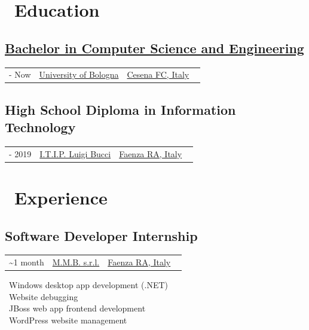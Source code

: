 \documentclass{article}
\makeatletter
\newcommand{\event}[3]{
    \begin{tabularx}{\linewidth}{@{}>{\raggedright\arraybackslash}X >{\centering\arraybackslash}X >{\raggedleft\arraybackslash}X@{}}
        #1 & #2 & #3
    \end{tabularx}
    \vspace{-10pt}
}
\makeatother
\begin{document}
\setlength{\columnsep}{50pt}
\begin{paracol}{2}
    \section*{\faGraduationCap \ Education}

    \begin{tcolorbox}
        \subsection*{\href{https://corsi.unibo.it/1cycle/ComputerScienceEngineering}{Bachelor in Computer Science and Engineering}}
        \event
            {\faCalendar* 2019 - Now}
            {\href{https://www.unibo.it/en/}{University of Bologna}}
            {\href{https://www.openstreetmap.org/relation/42809}{Cesena FC, Italy} \ \faCity}
    \end{tcolorbox}

    \begin{tcolorbox}
        \subsection*{High School Diploma in Information Technology}
        \event
            {\faCalendar* 2014 - 2019}
            {\href{https://www.itipfaenza.edu.it/}{I.T.I.P. Luigi Bucci}}
            {\href{https://www.openstreetmap.org/relation/43004}{Faenza RA, Italy} \ \faCity}
    \end{tcolorbox}


    \section*{\faBriefcase \ Experience}

    \begin{tcolorbox}
        \subsection*{Software Developer Internship}
        \event
            {\faCalendar* 2018 \textasciitilde 1 month}
            {\href{https://www.mmbsoftware.it/portalemmb/en/home}{M.M.B. s.r.l.}}
            {\href{https://www.openstreetmap.org/relation/43004}{Faenza RA, Italy} \ \faCity}

        \tcblower
        
        \faDesktop \ Windows desktop app development (.NET) \\
        \faBug \ Website debugging \\
        \faCoffee \ JBoss web app frontend development \\
        \faWordpress \ WordPress website management
    \end{tcolorbox}


\end{paracol}
\end{document}

